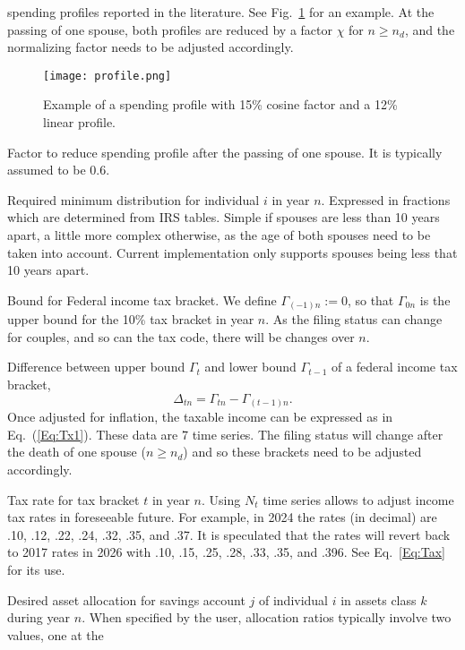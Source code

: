 \documentclass{article}[fleqn,12pt]
\begin{document}
\begin{description}[leftmargin=4em,style=multiline]
		spending profiles reported in the literature. See Fig.~\ref{Fig:profile} for an example.
	At the passing of one spouse, both profiles are reduced by a factor $\chi$ for $n \ge n_d$,
	and the normalizing factor needs to be adjusted accordingly.
		\begin{figure}[t]
		\texttt{[image: profile.png]}
		\caption{\small Example of a spending profile with 15\% cosine factor and a 12\% linear
		profile. \label{Fig:profile}}
		\end{figure}
\item [$\chi$]
	Factor to reduce spending profile after the passing of one spouse. It is typically
	assumed to be 0.6.
\item [$\rho_{in}$]
	Required minimum distribution for individual $i$ in year $n$. Expressed in fractions
	which are determined from IRS tables. Simple if spouses are less than 10 years apart,
	a little more complex otherwise, as the age of both spouses need to be taken into account.
	Current implementation only supports spouses being less that 10 years apart.
\item [$\Gamma_{tn}$]
	Bound for Federal income tax bracket. We define $\Gamma_{(-1)n} := 0$, so that
	$\Gamma_{0n}$ is the upper bound for the 10\% tax bracket in year $n$. As the filing status
	can change for couples, and so can the tax code, there will be changes over $n$.
\item [$\Delta_{tn}$]
	Difference between upper bound $\Gamma_t$ and lower bound $\Gamma_{t-1}$
	of a federal income tax bracket,
	\begin{equation}
		\Delta_{tn} = \Gamma_{tn} - \Gamma_{(t-1)n}.
	\end{equation}
	Once adjusted for inflation,
	the taxable income can be expressed as in Eq.~(\ref{Eq:Tx1}). These data are 7 time series.
	The filing status will change after the death of one spouse ($n \ge n_d$) and so these
	brackets need to be adjusted accordingly.
\item [$\theta_{tn}$]
	Tax rate for tax bracket $t$ in year $n$. Using $N_t$ time series allows to adjust income
	tax rates in foreseeable future.
	For example, in 2024 the rates (in decimal) are .10, .12, .22, .24, .32, .35, and .37.
	It is speculated that the rates will revert back to 2017 rates in 2026 with
	.10, .15, .25, .28, .33, .35, and .396. See Eq.~\ref{Eq:Tax} for its use.
\item [$\alpha_{ijkn}$]
	Desired asset allocation for savings account $j$ of individual $i$ in assets class $k$ during year $n$.
	When specified by the user, allocation ratios typically involve two values, one at the

\end{description}
\end{document}
